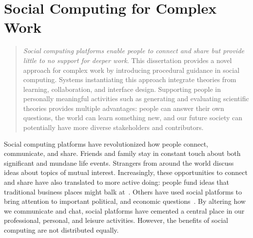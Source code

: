 \chapter{Social Computing for Complex Work}


\begin{quote}
\emph{Social computing platforms enable people to connect and share but provide little to no support for deeper work}. This dissertation provides a novel approach for complex work by introducing procedural guidance in social computing. Systems instantiating this approach integrate theories from learning, collaboration, and interface design. Supporting people in personally meaningful activities such as generating and evaluating scientific theories provides multiple advantages: people can answer their own questions, the world can learn something new, and our future society can potentially have more diverse stakeholders and contributors.
\end{quote}
\vspace{0.25in}

Social computing platforms have revolutionized how people connect, communicate, and share. Friends and family stay in constant touch about both significant and mundane life events. Strangers from around the world discuss ideas about topics of mutual interest. Increasingly, these opportunities to connect and share have also translated to more active doing: people fund ideas that traditional business places might balk at~\cite{hui2014understanding}. Others have used social platforms to bring attention to important political, and economic questions~\cite{tufekci2012social, fox2017social}. By altering how we communicate and chat, social platforms have cemented a central place in our professional, personal, and leisure activities. However, the benefits of social computing are not distributed equally. 

